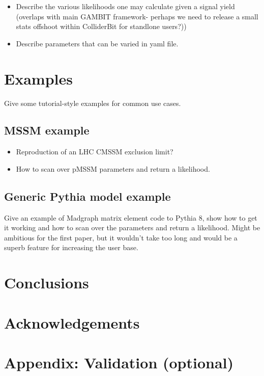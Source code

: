 \documentclass[11pt,a4paper]{article}
\begin{document}
\begin{itemize}
\item Describe the various likelihoods one may calculate given a signal yield (overlaps with main GAMBIT framework- perhaps we need to release a small stats offshoot within ColliderBit for standlone users?))
\item Describe parameters that can be varied in yaml file.
\end{itemize}

\section{Examples}

Give some tutorial-style examples for common use cases.

\subsection{MSSM example}

\begin{itemize}
\item Reproduction of an LHC CMSSM exclusion limit?
\item How to scan over pMSSM parameters and return a likelihood.

\end{itemize}

\subsection{Generic Pythia model example}

Give an example of Madgraph matrix element code to Pythia 8, show how to get it working and how to scan over the parameters and return a likelihood. Might be ambitious for the first paper, but it wouldn't take too long and would be a superb feature for increasing the user base.

\section{Conclusions}

\section{Acknowledgements}

\section{Appendix: Validation (optional)}
\end{document}
